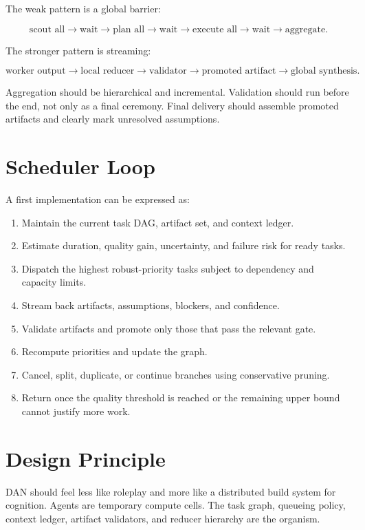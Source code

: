 \documentclass[11pt]{article}
\begin{document}
The weak pattern is a global barrier:

\[
\text{scout all} \rightarrow \text{wait} \rightarrow
\text{plan all} \rightarrow \text{wait} \rightarrow
\text{execute all} \rightarrow \text{wait} \rightarrow
\text{aggregate}.
\]

The stronger pattern is streaming:

\[
\text{worker output} \rightarrow
\text{local reducer} \rightarrow
\text{validator} \rightarrow
\text{promoted artifact} \rightarrow
\text{global synthesis}.
\]

Aggregation should be hierarchical and incremental. Validation should run before the end, not only as a final ceremony. Final delivery should assemble promoted artifacts and clearly mark unresolved assumptions.

\section{Scheduler Loop}

A first implementation can be expressed as:

\begin{enumerate}[leftmargin=1.5em]
\item Maintain the current task DAG, artifact set, and context ledger.
\item Estimate duration, quality gain, uncertainty, and failure risk for ready tasks.
\item Dispatch the highest robust-priority tasks subject to dependency and capacity limits.
\item Stream back artifacts, assumptions, blockers, and confidence.
\item Validate artifacts and promote only those that pass the relevant gate.
\item Recompute priorities and update the graph.
\item Cancel, split, duplicate, or continue branches using conservative pruning.
\item Return once the quality threshold is reached or the remaining upper bound cannot justify more work.
\end{enumerate}

\section{Design Principle}

DAN should feel less like roleplay and more like a distributed build system for cognition. Agents are temporary compute cells. The task graph, queueing policy, context ledger, artifact validators, and reducer hierarchy are the organism.
\end{document}
